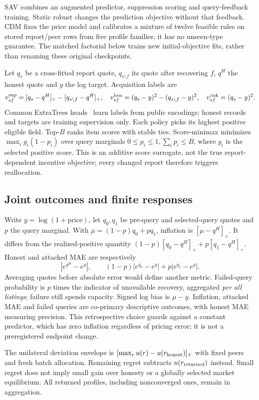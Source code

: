 \documentclass[11pt]{article}
\begin{document}
SAV combines an augmented predictor, suppression scoring and query-feedback
training. Static robust changes the prediction objective without that feedback.
CDM fixes the price model and calibrates a mixture of twelve feasible rules
on stored report/peer rows from five profile families; it has no unseen-type
guarantee. The matched factorial below trains new initial-objective fits,
rather than renaming these original checkpoints.

Let $q_s$ be a cross-fitted report quote, $q_{s\setminus f}$ its quote after
recovering $f$, $q^H$ the honest quote and $y$ the log target. Acquisition labels are
\[
 v^{\rm sup}_{sf}=[q_s-q^H]_+-[q_{s\setminus f}-q^H]_+,\quad
 v^{\rm ben}_{sf}=(q_s-y)^2-(q_{s\setminus f}-y)^2,\quad
 v^{\rm risk}_{sf}=(q_s-y)^2.
\]
Common ExtraTrees heads~\cite{extratrees} learn labels from public encodings;
honest records and targets are training supervision only. Each policy picks
its highest positive eligible field. Top-$B$ ranks item scores with stable
ties. Score-minimax minimizes $\max_i g_i(1-p_i)$ over query marginals
$0\le p_i\le1,\sum_i p_i\le B$, where $g_i$ is the selected positive score.
This is an additive score surrogate, not the true report-dependent incentive
objective; every changed report therefore triggers reallocation.

\subsection{Joint outcomes and finite responses}
Write $y=\log(1+\mathrm{price})$, let $q_0,q_1$ be pre-query and selected-query
quotes and $p$ the query marginal. With $\mu=(1-p)q_0+pq_1$, inflation is
$[\mu-q^H]_+$. It differs from the realized-positive quantity
$(1-p)[q_0-q^H]_++p[q_1-q^H]_+$. Honest and attacked MAE are respectively
\[
 |e^{q^H}-e^y|,\qquad (1-p)|e^{q_0}-e^y|+p|e^{q_1}-e^y|.
\]
Averaging quotes before absolute error would define another metric. Failed-query
probability is $p$ times the indicator of unavailable recovery, aggregated
\emph{per all listings}; failure still spends capacity. Signed log bias is
$\mu-y$. Inflation, attacked MAE and failed queries are co-primary descriptive
outcomes, with honest MAE measuring precision. This retrospective choice guards
against a constant predictor, which has zero inflation regardless of pricing
error; it is not a preregistered endpoint change.

The unilateral deviation envelope is
$[\max_r u(r)-u(r_{\rm honest})]_+$ with fixed peers and fresh batch allocation.
Remaining regret subtracts $u(r_{\rm returned})$ instead. Small regret does
not imply small gain over honesty or a globally selected market equilibrium.
All returned profiles, including nonconverged ones, remain in aggregation.
\end{document}
